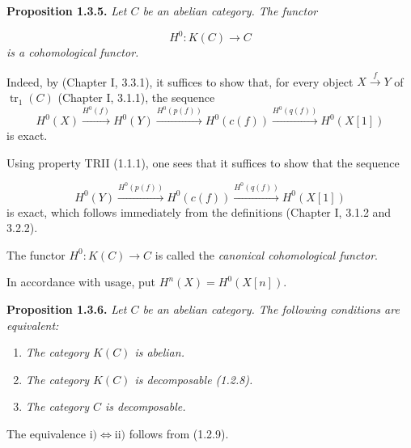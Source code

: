 \clearpage
{}%
\begingroup
\small
\setlength{\emergencystretch}{1.5em}%
\setlength{\abovedisplayskip}{4pt plus 2pt minus 2pt}%
\setlength{\belowdisplayskip}{4pt plus 2pt minus 2pt}%

\noindent\textbf{Proposition 1.3.5.}\quad
\emph{Let $C$ be an abelian category. The functor}

\[
  H^0\colon K(C)\longrightarrow C
\]
\noindent\emph{is a cohomological functor.}

Indeed, by (Chapter I, 3.3.1), it suffices to show that, for every object
$X\xrightarrow{f}Y$ of $\operatorname{tr}_1(C)$ (Chapter I, 3.1.1), the
sequence
\[
  H^0(X)\xrightarrow{H^0(f)}H^0(Y)
  \xrightarrow{H^0(p(f))}H^0(c(f))
  \xrightarrow{H^0(q(f))}H^0(X[1])
\]
\noindent is exact.

Using property TRII (1.1.1), one sees that it suffices to show that the
sequence

\[
  H^0(Y)\xrightarrow{H^0(p(f))}H^0(c(f))
  \xrightarrow{H^0(q(f))}H^0(X[1])
\]
\noindent is exact, which follows immediately from the definitions
(Chapter I, 3.1.2 and 3.2.2).

The functor $H^0\colon K(C)\longrightarrow C$ is called the
\emph{canonical cohomological functor}.

In accordance with usage, put $H^n(X)=H^0(X[n])$.

\medskip
\noindent\textbf{Proposition 1.3.6.}\quad
\emph{Let $C$ be an abelian category. The following conditions are
equivalent:}

\begin{enumerate}
\renewcommand{\labelenumi}{\roman{enumi})}
\item \emph{The category $K(C)$ is abelian.}
\item \emph{The category $K(C)$ is decomposable (1.2.8).}
\item \emph{The category $C$ is decomposable.}
\end{enumerate}

The equivalence
$\mathrm{i)}\Longleftrightarrow\mathrm{ii)}$ follows from (1.2.9).

